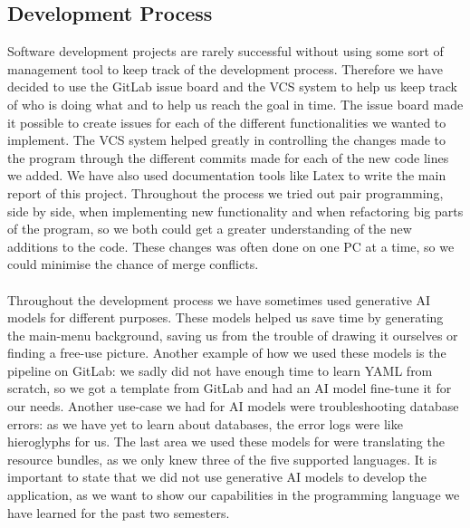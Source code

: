 \documentclass[British]{article}
\begin{document}
\subsection{Development Process}
Software development projects are rarely successful without using some sort of management tool to keep track of the development process. Therefore we have decided to use the GitLab issue board and the VCS system to help us keep track of who is doing what and to help us reach the goal in time. The issue board made it possible to create issues for each of the different functionalities we wanted to implement. The VCS system helped greatly in controlling the changes made to the program through the different commits made for each of the new code lines we added. We have also used documentation tools like Latex to write the main report of this project. Throughout the process we tried out pair programming, side by side, when implementing new functionality and when refactoring big parts of the program, so we both could get a greater understanding of the new additions to the code. These changes was often done on one PC at a time, so we could minimise the chance of merge conflicts.  
\\\\
Throughout the development process we have sometimes used generative AI models for different purposes. These models helped us save time by generating the main-menu background, saving us from the trouble of drawing it ourselves or finding a free-use picture. Another example of how we used these models is the pipeline on GitLab: we sadly did not have enough time to learn YAML from scratch, so we got a template from GitLab and had an AI model fine-tune it for our needs. Another use-case we had for AI models were troubleshooting database errors: as we have yet to learn about databases, the error logs were like hieroglyphs for us. The last area we used these models for were translating the resource bundles, as we only knew three of the five supported languages. It is important to state that we did not use generative AI models to develop the application, as we want to show our capabilities in the programming language we have learned for the past two semesters.
\end{document}
